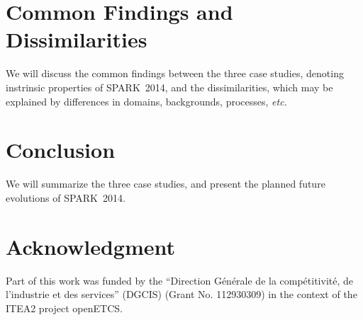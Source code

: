 \documentclass[10pt,a4paper,twocolumn]{article}
\newcommand{\openetcs}{openETCS\xspace}
\newcommand{\newspark}{SPARK~2014\xspace}
\newcommand{\etc}{\textit{etc.}\xspace}
\begin{document}
\section{Common Findings and Dissimilarities}

We will discuss the common findings between the three case studies,
denoting instrinsic properties of \newspark, and the dissimilarities,
which may be explained by differences in domains, backgrounds,
processes, \etc

\section{Conclusion}

We will summarize the three case studies, and present the planned future
evolutions of \newspark.

\section{Acknowledgment}

Part of this work was funded by the ``Direction Générale de la
compétitivité, de l'industrie et des services'' (DGCIS) (Grant
No. 112930309) in the context of the ITEA2 project \openetcs.



\end{document}

